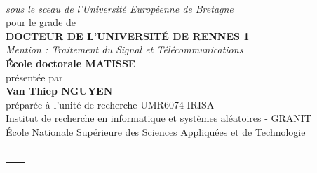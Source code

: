 \begin{titlepage}
\begin{center}
\begin{minipage}{\glarg}
\vspace{0.5cm}
\\ \vspace{0mm}\emph{\Large sous le sceau de l'Universit\'e Europ\'eenne de Bretagne}\\ \vspace{0.5cm}
{\Large pour le grade de}\\ \vspace{2mm}
{\Large\bf DOCTEUR DE L'UNIVERSIT\'E DE RENNES 1}\\ \vspace{0.4cm}
\emph{\Large Mention :  Traitement du Signal et T\'el\'ecommunications}\\ \vspace{2mm}
{\Large\bf \'Ecole doctorale MATISSE}\\ \vspace{0.3cm}
{\Large pr\'esent\'ee par} \\ \vspace{3mm}
{\Huge\bf Van Thiep NGUYEN}\\ \vspace{0.4cm}
{\Large pr\'epar\'ee \`a l'unit\'e de recherche UMR6074 IRISA\\
\hspace{-1cm}Institut de recherche en informatique et syst\`emes al\'eatoires - GRANIT\\
\hspace{-1cm}\'Ecole Nationale Sup\'erieure des Sciences Appliqu\'ees et de Technologie}\vspace{0.3cm}
\\
\hspace{-20mm}{\rule{\Glarg}{1pt}}\\
\vspace{8mm}

\begin{tabular}{p{7cm}p{10cm}}
\begin{minipage}{\plarg}





\end{minipage}
\end{tabular}
\end{minipage}
\end{center}
\end{titlepage}
